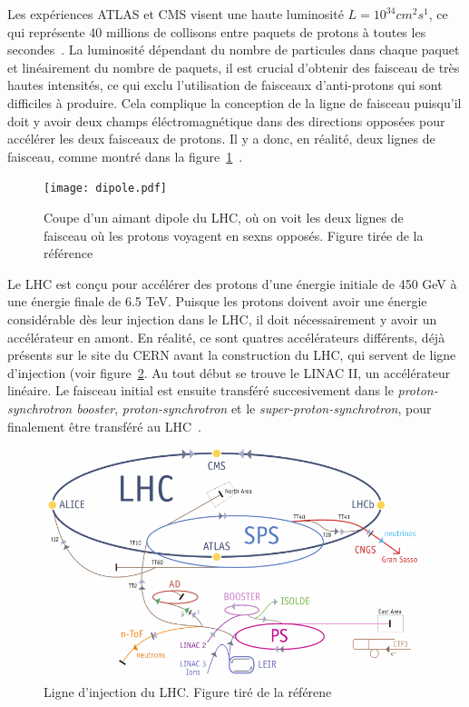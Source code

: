Les expériences ATLAS et CMS visent une haute luminosité
$L = 10^{34} cm^2 s^1$, ce qui représente 40 millions de collisons
entre paquets de protons à toutes les
secondes~\cite{collaboration_atlas_2008}. La luminosité dépendant du
nombre de particules dans chaque paquet et linéairement du nombre de
paquets, il est crucial d'obtenir des faisceau de très hautes
intensités, ce qui exclu l'utilisation de faisceaux d'anti-protons
qui sont difficiles à produire. Cela complique la conception de la
ligne de faisceau puisqu'il doit y avoir deux champs éléctromagnétique
dans des directions opposées pour accélérer les deux faisceaux de
protons. Il y a donc, en réalité, deux lignes de faisceau, comme
montré dans la figure~\ref{fig:dipole}~\cite{evans_lhc_2008}.

\begin{figure}
  \centering
  \texttt{[image: dipole.pdf]}
  \caption{Coupe d'un aimant dipole du LHC, où on voit les deux lignes
    de faisceau où les protons voyagent en sexns opposés. Figure tirée
    de la référence~\cite{evans_lhc_2008}}
\label{fig:dipole}
\end{figure}

Le LHC est conçu pour accélérer des protons d'une énergie initiale de
450 GeV à une énergie finale de 6.5 TeV. Puisque les protons doivent
avoir une énergie considérable dès leur injection dans le LHC, il doit
nécessairement y avoir un accélérateur en amont. En réalité, ce sont
quatres accélérateurs différents, déjà présents sur le site du CERN
avant la construction du LHC, qui servent de ligne d'injection (voir
figure~\ref{fig:lhc_injection}. Au tout début se trouve le LINAC II,
un accélérateur linéaire. Le faisceau initial est ensuite transféré
succesivement dans le \emph{proton-synchrotron booster},
\emph{proton-synchrotron} et le \emph{super-proton-synchrotron}, pour
finalement être transféré au LHC~\cite{evans_lhc_2008}.

\begin{figure}
  \centering
  \includegraphics{lhc_injection.pdf}
  \caption{Ligne d'injection du LHC. Figure tiré de la
    référene~\cite{Lefevre:1165534}}
  \label{fig:lhc_injection}
\end{figure}



